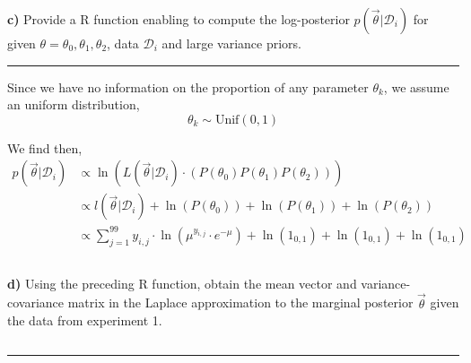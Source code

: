 \inputminted[frame=lines]{r}{code/q1b.r}

\textbf{c)} Provide a R function enabling to compute the log-posterior $p(\vec{\theta}|\mathcal{D}_i)$ for given $\theta = \theta_0, \theta_1, \theta_2$, data $\mathcal{D}_i$ and large variance priors.

\begin{center}\rule{6cm}{0.4pt}\end{center}

Since we have no information on the proportion of any parameter $\theta_k$, we assume an uniform distribution,
\begin{equation}
	\theta_k \sim \text{Unif}(0,1)
\end{equation}

We find then,
\begin{align*}
	p(\vec{\theta}|\mathcal{D}_i)
		&\propto \ln(L(\vec{\theta}|\mathcal{D}_i) \cdot (P(\theta_0) P(\theta_1) P(\theta_2))) \\
		&\propto l(\vec{\theta}|\mathcal{D}_i) + \ln(P(\theta_0)) + \ln(P(\theta_1)) + \ln(P(\theta_2)) \\
		&\propto \sum_{j=1}^{99} y_{i, j} \cdot \ln(\mu^{y_{i,j}} \cdot e^{-\mu}) + \ln(1_{0,1}) + \ln(1_{0,1}) + \ln(1_{0,1})
\end{align*}

\inputminted[frame=lines]{r}{code/q1c.r}

\textbf{d)} Using the preceding R function, obtain the mean vector and variance-covariance matrix in the Laplace approximation to the marginal posterior $\vec{\theta}$ given the data from experiment 1.

\inputminted{r}{code/q1d.r}

\begin{center}\rule{6cm}{0.4pt}\end{center}